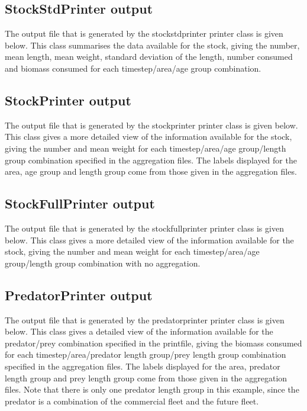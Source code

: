 \documentclass[10pt,titlepage]{article}
\begin{document}
\subsection{StockStdPrinter output}
The output file that is generated by the stockstdprinter printer class is given below.  This class summarises the data available for the stock, giving the number, mean length, mean weight, standard deviation of the length, number consumed and biomass consumed for each timestep/area/age group combination.

{\small }

\subsection{StockPrinter output}
The output file that is generated by the stockprinter printer class is given below.  This class gives a more detailed view of the information available for the stock, giving the number and mean weight for each timestep/area/age group/length group combination specified in the aggregation files.  The labels displayed for the area, age group and length group come from those given in the aggregation files.

{\small }

\subsection{StockFullPrinter output}
The output file that is generated by the stockfullprinter printer class is given below.  This class gives a more detailed view of the information available for the stock, giving the number and mean weight for each timestep/area/age group/length group combination with no aggregation.

{\small }

\subsection{PredatorPrinter output}
The output file that is generated by the predatorprinter printer class is given below.  This class gives a detailed view of the information available for the predator/prey combination specified in the printfile, giving the biomass consumed for each timestep/area/predator length group/prey length group combination specified in the aggregation files.  The labels displayed for the area, predator length group and prey length group come from those given in the aggregation files.  Note that there is only one predator length group in this example, since the predator is a combination of the commercial fleet and the future fleet.
\end{document}
